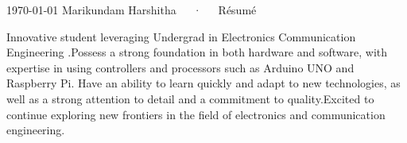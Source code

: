 \documentclass[11pt, a4paper]{russell}
\date*{}
\begin{document}
\makecvheader
\makecvfooter
  {\today}
  {Marikundam Harshitha~~~·~~~Résumé}
  {\thepage}


 
 Innovative student leveraging Undergrad in Electronics Communication Engineering .Possess a  strong foundation in both hardware and software, with expertise in using controllers and processors such as Arduino UNO and Raspberry Pi. Have  an ability to learn quickly and adapt to new technologies, as well as a strong attention to detail and a commitment to quality.Excited to continue exploring new frontiers in the field of electronics and communication engineering.

\end{document}
